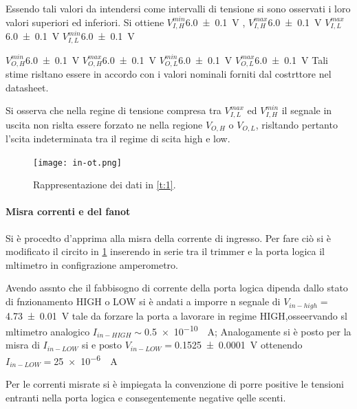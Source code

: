 	 Essendo tali valori da intendersi come intervalli di tensione si sono osservati i loro valori superiori ed inferiori.
	 Si ottiene $V_{I,H}^{min}$\SI{6.0 \pm 0.1}{\volt} ,
	 			$V_{I,H}^{max}$\SI{6.0 \pm 0.1}{\volt}
	 			$V_{I,L}^{max}$\SI{6.0 \pm 0.1}{\volt}
	 			$V_{I,L}^{min}$\SI{6.0 \pm 0.1}{\volt}
	 			
	 			$V_{O,H}^{min}$\SI{6.0 \pm 0.1}{\volt}
	 			$V_{O,H}^{max}$\SI{6.0 \pm 0.1}{\volt}
	 			$V_{O,L}^{min}$\SI{6.0 \pm 0.1}{\volt}
	 			$V_{O,L}^{max}$\SI{6.0 \pm 0.1}{\volt}
	 Tali stime risltano essere in accordo con i valori
	 nominali forniti dal costrttore nel datasheet.
	 
	 Si osserva che nella regine di tensione compresa tra 	$V_{I,L}^{max}$ ed $V_{I,H}^{min}$ il segnale in uscita non rislta essere forzato ne nella regione $V_{O,H}$ o $V_{O,L}$, risltando pertanto  l'scita indeterminata tra il regime di scita high e low.
	\begin{center}
		\begin{figure}[h]
			\texttt{[image: in-ot.png]}
			\caption{Rappresentazione dei dati in \tablename{ \ref{t:1}}.}
			\label{f:i1}
		\end{figure}
	\end{center}
\paragraph{Misra correnti e del fanot}
	Si è procedto d'apprima alla misra della corrente di ingresso.
	Per fare ciò si è modificato il circito in \figurename{ \ref{f:i1}} inserendo in serie tra il trimmer e la porta logica il mltimetro in configrazione amperometro.
	
	Avendo assnto che il fabbisogno di corrente della porta logica dipenda 	dallo stato di fnzionamento HIGH o LOW
	si è andati a imporre n segnale di $V_{in-high}=$\SI{4.73\pm 0.01}{\volt} tale da forzare la porta a lavorare in regime HIGH,osseervando sl mltimetro analogico $I_{in-HIGH}\sim$\SI{0.5e-10}{\mu \ampere};
	Analogamente si è posto per la misra di  $I_{in-LOW}$ si e posto  $V_{in-LOW}=$\SI{0.1525\pm 0.0001}{\volt} ottenendo $I_{in-LOW}=$\SI{25e-6}{\mu \ampere}
	
	
	Per le correnti misrate si è impiegata la convenzione di porre positive le tensioni entranti nella porta  logica e consegentemente negative qelle scenti.
	
